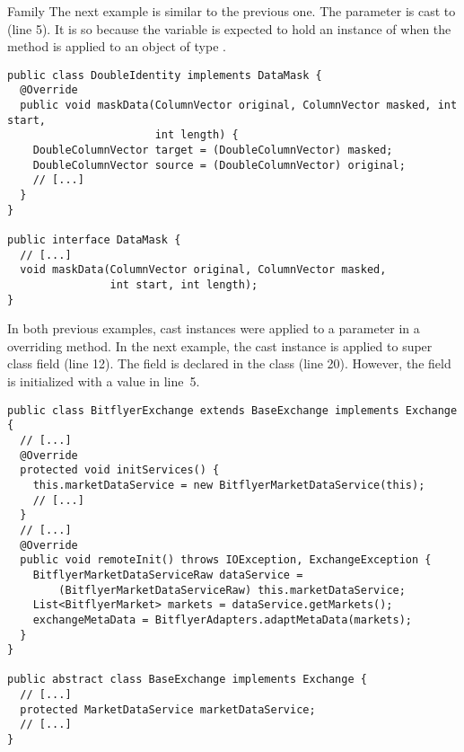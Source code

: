 \begin{pattern}{Family}
The next example%
\def\urlvar{http://bit.ly/apache_orc_2SE4C2m}
is similar to the previous one.
The  parameter is cast to  (line 5).
It is so because the  variable is expected to hold an instance of  when the  method is applied to an object of type .

\begin{verbatim}
public class DoubleIdentity implements DataMask {
  @Override
  public void maskData(ColumnVector original, ColumnVector masked, int start,
                       int length) {
    DoubleColumnVector target = (DoubleColumnVector) masked;
    DoubleColumnVector source = (DoubleColumnVector) original;
    // [...]
  }
}

public interface DataMask {
  // [...]
  void maskData(ColumnVector original, ColumnVector masked,
                int start, int length);
}

\end{verbatim}

In both previous examples,
cast instances were applied to a parameter in a overriding method.
In the next example,%
\def\urlvar{http://bit.ly/knowm_XChange_2UPPDj9}
the cast instance is applied to super class field (line 12).
The field is declared in the  class (line 20).
However, the field is initialized with a  value in line~5.

\begin{verbatim}
public class BitflyerExchange extends BaseExchange implements Exchange {
  // [...]
  @Override
  protected void initServices() {
    this.marketDataService = new BitflyerMarketDataService(this);
    // [...]
  }
  // [...]
  @Override
  public void remoteInit() throws IOException, ExchangeException {
    BitflyerMarketDataServiceRaw dataService =
        (BitflyerMarketDataServiceRaw) this.marketDataService;
    List<BitflyerMarket> markets = dataService.getMarkets();
    exchangeMetaData = BitflyerAdapters.adaptMetaData(markets);
  }
}

public abstract class BaseExchange implements Exchange {
  // [...]
  protected MarketDataService marketDataService;
  // [...]
}
\end{verbatim}


\end{pattern}
